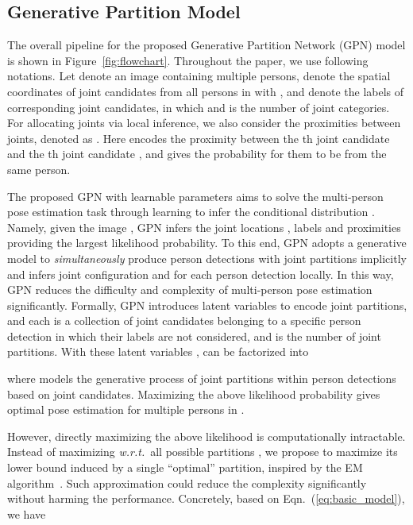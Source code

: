 \documentclass[10pt,twocolumn,letterpaper]{article}
\begin{document}
\subsection{Generative Partition Model}


The overall pipeline for the proposed  Generative Partition Network (GPN) model is shown in Figure~\ref{fig:flowchart}. Throughout the paper, we use following notations. Let   denote an image containing multiple persons,  denote the spatial coordinates  of  joint candidates from all persons in  with , and  denote the labels of corresponding joint candidates, in which  and    is the number of joint categories. For allocating joints via local inference, we also consider the proximities  between  joints, denoted as . Here  encodes the proximity  between  the th joint candidate 
and the th joint candidate , and gives the probability for them to be from the same person.

The proposed GPN  with learnable parameters  aims  to  solve the multi-person pose estimation task through learning to infer the conditional distribution . Namely,  given the image , GPN infers the joint locations , labels  and proximities  providing the largest likelihood probability. To this end,  GPN adopts a generative model to \emph{simultaneously} produce person detections with joint partitions implicitly and infers joint configuration  and   for each person detection locally. In this way, GPN reduces the difficulty and complexity of multi-person pose estimation significantly. Formally, GPN introduces latent variables   to encode joint partitions, and each  is a collection of joint candidates belonging  to a specific person detection in which their labels are not considered, and  is the number of joint partitions.
With these latent variables ,  can be factorized  into

where  models the generative process of joint partitions within person detections based on joint candidates. Maximizing the above likelihood probability  gives optimal pose estimation for multiple persons in  .

However, directly maximizing the above  likelihood is computationally intractable.  Instead of maximizing \emph{w.r.t.}\ all possible partitions , we propose to maximize its lower bound
induced by a single ``optimal'' partition, inspired by the EM algorithm~\cite{dempster1977maximum}. Such approximation  could reduce the complexity significantly without harming the performance.
Concretely,  based on Eqn.~(\ref{eq:basic_model}), we have
\end{document}
